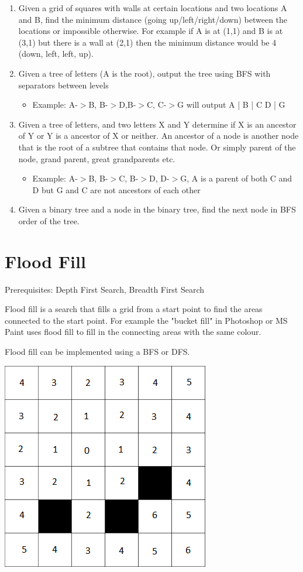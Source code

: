 \documentclass[11pt,oneside]{book}
\makeatletter
\def\maxwidth#1{\ifdim\Gin@nat@width>#1 #1\else\Gin@nat@width\fi}
\makeatother
\begin{document}
\begin{enumerate}
\item Given a grid of squares with walls at certain locations and two locations A and B, find the minimum distance (going up/left/right/down) between the locations or impossible otherwise. For example if A is at (1,1) and B is at (3,1) but there is a wall at (2,1) then the minimum distance would be 4 (down, left, left, up). 
\item Given a tree of letters (A is the root), output the tree using BFS with separators between levels

\begin{itemize}
\item Example: A-$>$B, B-$>$D,B-$>$C, C-$>$G will output A | B | C D | G 
\end{itemize}
\item Given a tree of letters, and two letters X and Y determine if X is an ancestor of Y or Y is a ancestor of X or neither. An ancestor of a node is another node that is the root of a subtree that contains that node. Or simply parent of the node, grand parent, great grandparents etc.

\begin{itemize}
\item Example: A-$>$B, B-$>$C, B-$>$D, D-$>$G,  A is a parent of both C and D but G and C are not ancestors of each other
\end{itemize}
\item Given a binary tree and a node in the binary tree, find the next node in BFS order of the tree.
\end{enumerate}

        \section{ Flood Fill }
        

Prerequisites: Depth First Search, Breadth First Search

Flood fill is a search that fills a grid from a start point to find the areas connected to the start point. For example the "bucket fill" in Photoshop or MS Paint uses flood fill to fill in the connecting areas with the same colour.

Flood fill can be implemented using a BFS or DFS.

\includegraphics[width=\maxwidth{\textwidth}]{floodfill.png}
\end{document}
